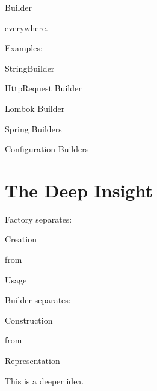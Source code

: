 \documentclass[11pt,a4paper]{book}
\begin{document}

Builder


everywhere.


Examples:


StringBuilder


HttpRequest Builder


Lombok Builder


Spring Builders


Configuration Builders


\section{The Deep Insight}

Factory separates:


Creation

from

Usage


Builder separates:


Construction

from

Representation


This is a deeper idea.

\end{document}
